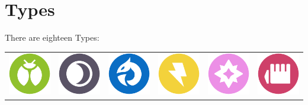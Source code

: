 \chapter{Types}
There are eighteen Types:

\begin{table}
  \begin{tabular}{c c c c c c}
  \includegraphics[scale=.25]{images/bug.png} &
    \includegraphics[scale=.25]{images/dark.png} &
    \includegraphics[scale=.25]{images/dragon.png} &
    \includegraphics[scale=.25]{images/electric.png} &
    \includegraphics[scale=.25]{images/fairy.png} &
    \includegraphics[scale=.25]{images/fighting.png} \\

\end{tabular}
\end{table}
